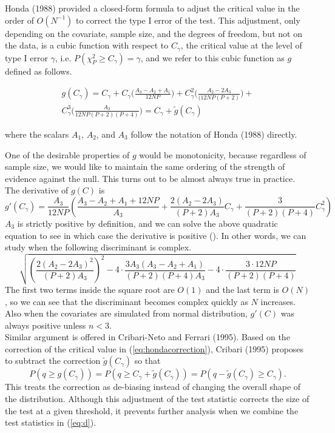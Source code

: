 \documentclass[aoas,authoryear, preprint]{imsart}
\numberwithin{equation}{section}
\theoremstyle{plain}
\begin{document}
Honda (1988) provided a closed-form formula to adjust the critical value in the order of $O(N^{-1})$ to correct the type I error of the test. This adjustment, only depending on the covariate, sample size, and the degrees of freedom, but not on the data, is a cubic function with respect to $C_{\gamma}$, the critical value at the level of type I error $\gamma$, i.e. $P(\chi_{P}^2 \geq C_{\gamma}) = \gamma$, and we refer to this cubic function as $g$ defined as follows.

\begin{equation}
    \begin{multlined}
g(C_{\gamma}) = C_{\gamma} + C_{\gamma}\bigg(\frac{A_3 - A_2 + A_1}{12NP}\bigg) + C_{\gamma}^2\bigg(\frac{A_2 - 2A_3}{(12NP(P+2)}\bigg) +\\
C_{\gamma}^3 \bigg(\frac{A_3}{12NP(P+2)(P+4)}\bigg) = C_{\gamma} + \tilde{g}(C_{\gamma})
\end{multlined}
\label{eq:hondacorrection}
\end{equation}

where the scalars $A_1$, $A_2$, and $A_3$ follow the notation of Honda (1988) directly. 

\vspace{5mm}  
One of the desirable properties of $g$ would be monotonicity, because regardless of sample size, we would like to maintain the same ordering of the strength of evidence against the null. This turns out to be almost always true in practice. The derivative of $g(C)$ is 
$$g'(C_{\gamma}) = \frac{A_3}{12NP}\left( \frac{A_3-A_2+A_1+12NP}{A_3} + 
 \frac{2(A_2-2A_3)}{(P+2)A_3}C_{\gamma} + \frac{3}{(P+2)(P+4)}C_{\gamma}^2 \right)$$
$A_3$ is strictly positive by definition, and we can solve the above quadratic equation to see in which case the derivative is positive (\cite{cribari1995improved}). In other words, we can study when the following discriminant is complex.
$$\sqrt{\left(\frac{2(A_2-2A_3)^2}{(P+2)A_3}\right)^2 - 4\cdot\frac{3A_3(A_3-A_2+A_1)}{(P+2)(P+4)A_3} - 4\cdot
\frac{3 \cdot 12NP}{(P+2)(P+4)}}$$
The first two terms inside the square root are $O(1)$ and the last term is $O(N)$, so we can see that the discriminant becomes complex quickly as $N$ increases. Also when the covariates are simulated from normal distribution, $g'(C)$ was always positive unless $n<3$. \\


Similar argument is offered in Cribari-Neto and Ferrari (1995). Based on the correction of the critical value in (\ref{eq:hondacorrection}), Cribari (1995) proposes to subtract the correction $\tilde{g}(C_{\gamma})$ so that
$$P(q  \geq g(C_{\gamma})) = P(q \geq C_{\gamma} + \tilde{g}(C_{\gamma})) = P(q - \tilde{g}(C_{\gamma}) \geq C_{\gamma}).$$
This treats the correction as de-biasing instead of changing the overall shape of the distribution. Although this adjustment of the test statistic corrects the size of the test at a given threshold, it prevents further analysis when we combine the test statistics in (\ref{eq:d}). 
\end{document}
